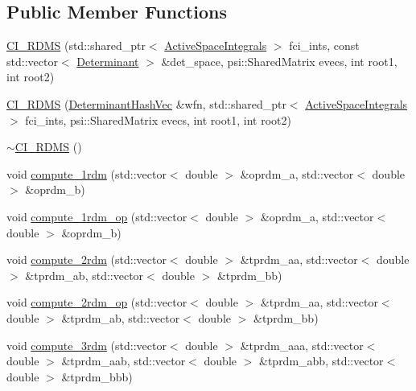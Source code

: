\subsection*{Public Member Functions}
\begin{DoxyCompactItemize}
\item 
\mbox{\hyperlink{classforte_1_1_c_i___r_d_m_s_a492dfe2daedba96524e378dff6d8881b}{C\+I\+\_\+\+R\+D\+MS}} (std\+::shared\+\_\+ptr$<$ \mbox{\hyperlink{classforte_1_1_active_space_integrals}{Active\+Space\+Integrals}} $>$ fci\+\_\+ints, const std\+::vector$<$ \mbox{\hyperlink{namespaceforte_a2076c63fd7b8732004d9e1442ce527c1}{Determinant}} $>$ \&det\+\_\+space, psi\+::\+Shared\+Matrix evecs, int root1, int root2)
\item 
\mbox{\hyperlink{classforte_1_1_c_i___r_d_m_s_a080710371be0841dd7d412f0107820c2}{C\+I\+\_\+\+R\+D\+MS}} (\mbox{\hyperlink{classforte_1_1_determinant_hash_vec}{Determinant\+Hash\+Vec}} \&wfn, std\+::shared\+\_\+ptr$<$ \mbox{\hyperlink{classforte_1_1_active_space_integrals}{Active\+Space\+Integrals}} $>$ fci\+\_\+ints, psi\+::\+Shared\+Matrix evecs, int root1, int root2)
\item 
\mbox{\hyperlink{classforte_1_1_c_i___r_d_m_s_ae32becd6a38ea945e795ed78edb5c38d}{$\sim$\+C\+I\+\_\+\+R\+D\+MS}} ()
\item 
void \mbox{\hyperlink{classforte_1_1_c_i___r_d_m_s_ab16c501467a25a727092c89462eeb095}{compute\+\_\+1rdm}} (std\+::vector$<$ double $>$ \&oprdm\+\_\+a, std\+::vector$<$ double $>$ \&oprdm\+\_\+b)
\item 
void \mbox{\hyperlink{classforte_1_1_c_i___r_d_m_s_ad232dbb35aa59e9edcdc86626d3a883d}{compute\+\_\+1rdm\+\_\+op}} (std\+::vector$<$ double $>$ \&oprdm\+\_\+a, std\+::vector$<$ double $>$ \&oprdm\+\_\+b)
\item 
void \mbox{\hyperlink{classforte_1_1_c_i___r_d_m_s_ab881ee2d8f370683a18b6659c542e868}{compute\+\_\+2rdm}} (std\+::vector$<$ double $>$ \&tprdm\+\_\+aa, std\+::vector$<$ double $>$ \&tprdm\+\_\+ab, std\+::vector$<$ double $>$ \&tprdm\+\_\+bb)
\item 
void \mbox{\hyperlink{classforte_1_1_c_i___r_d_m_s_a4eba66bbdea6356a9abd92c666e60912}{compute\+\_\+2rdm\+\_\+op}} (std\+::vector$<$ double $>$ \&tprdm\+\_\+aa, std\+::vector$<$ double $>$ \&tprdm\+\_\+ab, std\+::vector$<$ double $>$ \&tprdm\+\_\+bb)
\item 
void \mbox{\hyperlink{classforte_1_1_c_i___r_d_m_s_a4c08b96e09691f3ad4b00efc4c38fb94}{compute\+\_\+3rdm}} (std\+::vector$<$ double $>$ \&tprdm\+\_\+aaa, std\+::vector$<$ double $>$ \&tprdm\+\_\+aab, std\+::vector$<$ double $>$ \&tprdm\+\_\+abb, std\+::vector$<$ double $>$ \&tprdm\+\_\+bbb)

\end{DoxyCompactItemize}
